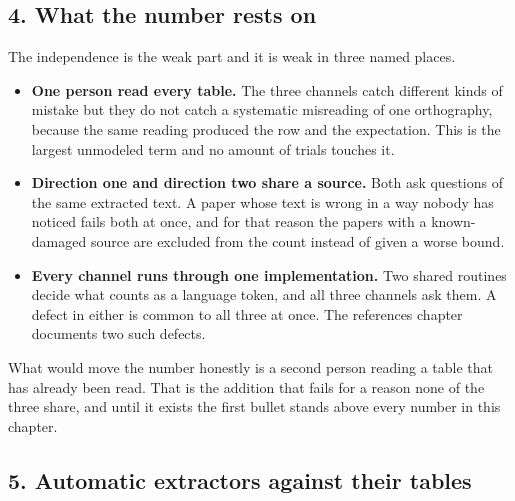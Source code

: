 \subsection{4. What the number rests on}

The independence is the weak part and it is weak in three named places.

\begin{itemize}
\item \textbf{One person read every table.} The three channels catch different kinds of mistake but they do not catch a systematic misreading of one orthography, because the same reading produced the row and the expectation. This is the largest unmodeled term and no amount of trials touches it.
\item \textbf{Direction one and direction two share a source.} Both ask questions of the same extracted text. A paper whose text is wrong in a way nobody has noticed fails both at once, and for that reason the papers with a known-damaged source are excluded from the count instead of given a worse bound.
\item \textbf{Every channel runs through one implementation.} Two shared routines decide what counts as a language token, and all three channels ask them. A defect in either is common to all three at once. The references chapter documents two such defects.
\end{itemize}

What would move the number honestly is a second person reading a table that has already been read. That is the addition that fails for a reason none of the three share, and until it exists the first bullet stands above every number in this chapter.

\subsection{5. Automatic extractors against their tables}

